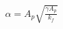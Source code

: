 \documentclass[preview]{standalone}
\begin{document}
\begin{align*}
\alpha = A_p \sqrt{\frac{\gamma A_p}{k_f}}
\end{align*}
\end{document}
